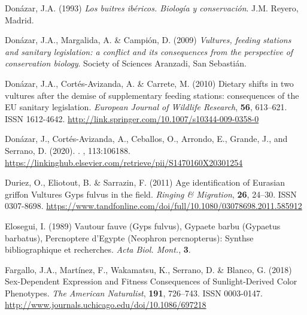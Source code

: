 \documentclass[12pt]{article}
\begin{document}
\begin{thebibliography}{87}
	Don{\'{a}}zar, J.A. (1993) \emph{{Los buitres ib{\'{e}}ricos. Biolog{\'{i}}a y
			conservaci{\'{o}}n}}.
	\newblock J.M. Reyero, Madrid.
	
	Don{\'{a}}zar, J.A., Margalida, A. \& Campi{\'{o}}n, D. (2009) \emph{{Vultures,
			feeding stations and sanitary legislation: a conflict and its consequences
			from the perspective of conservation biology}}.
	\newblock Society of Sciences Aranzadi, San Sebasti{\'{a}}n.
	
	Don{\'{a}}zar, J.A., Cort{\'{e}}s-Avizanda, A. \& Carrete, M. (2010) {Dietary
		shifts in two vultures after the demise of supplementary feeding stations:
		consequences of the EU sanitary legislation}.
	\newblock \emph{European Journal of Wildlife Research}, \textbf{56}, 613--621.
	\newblock ISSN 1612-4642.
	\newline\urlprefix\url{http://link.springer.com/10.1007/s10344-009-0358-0}
	
	Don{\'{a}}zar, J., Cort{\'{e}}s-Avizanda, A., Ceballos, O., Arrondo, E.,
	Grande, J., and Serrano, D. (2020).
	.
	, 113:106188.
	\newline\urlprefix\url{https://linkinghub.elsevier.com/retrieve/pii/S1470160X20301254}
	
	Duriez, O., Eliotout, B. \& Sarrazin, F. (2011) {Age identification of Eurasian
		griffon Vultures Gyps fulvus in the field}.
	\newblock \emph{Ringing {\&} Migration}, \textbf{26}, 24--30.
	\newblock ISSN 0307-8698.
	\newline\urlprefix\url{https://www.tandfonline.com/doi/full/10.1080/03078698.2011.585912}
	
	Elosegui, I. (1989) {Vautour fauve (Gyps fulvus), Gypaete barbu (Gypaetus
		barbatus), Percnoptere d'Egypte (Neophron percnopterus): Synthse
		bibliographique et recherches}.
	\newblock \emph{Acta Biol. Mont.}, \textbf{3}.
	
	Fargallo, J.A., Mart{\'{i}}nez, F., Wakamatsu, K., Serrano, D. \& Blanco, G.
	(2018) {Sex-Dependent Expression and Fitness Consequences of Sunlight-Derived
		Color Phenotypes}.
	\newblock \emph{The American Naturalist}, \textbf{191}, 726--743.
	\newblock ISSN 0003-0147.
	\newline\urlprefix\url{http://www.journals.uchicago.edu/doi/10.1086/697218}
	

\end{thebibliography}
\end{document}
